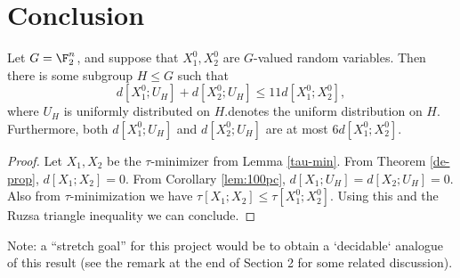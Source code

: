 \section{Conclusion}

\begin{theorem}\label{entropy-pfr}
  \leanok
  Let $G = \F_2^n$, and suppose that $X^0_1, X^0_2$ are $G$-valued random variables.
  Then there is some subgroup $H \leq G$ such that
  \[
    d[X^0_1;U_H] + d[X^0_2;U_H] \le 11 d[X^0_1;X^0_2],
  \]
  where $U_H$ is uniformly distributed on $H$.denotes the uniform distribution on $H$.
  Furthermore, both $d[X^0_1;U_H]$ and $d[X^0_2;U_H]$ are at most $6 d[X^0_1;X^0_2]$.
\end{theorem}

\begin{proof}  \leanok  Let $X_1, X_2$ be the $\tau$-minimizer from Lemma \ref{tau-min}.  From Theorem \ref{de-prop}, $d[X_1;X_2]=0$.  From Corollary \ref{lem:100pc}, $d[X_1;U_H] = d[X_2; U_H] = 0$.  Also from $\tau$-minimization we have $\tau[X_1;X_2] \leq \tau[X^0_1;X^0_2]$.  Using this and the Ruzsa triangle inequality we can conclude.
\end{proof}

Note: a ``stretch goal'' for this project would be to obtain a `decidable` analogue of this result (see the remark at the end of Section 2 for some related discussion).
